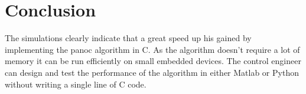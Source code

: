 \section{Conclusion}

The simulations  clearly indicate that a great speed up his gained by implementing the panoc algorithm in C. As the algorithm doesn't require a lot of memory it can be run efficiently on small embedded devices. The control engineer can design and test the performance of the algorithm in either Matlab or Python without writing a single line of C code.